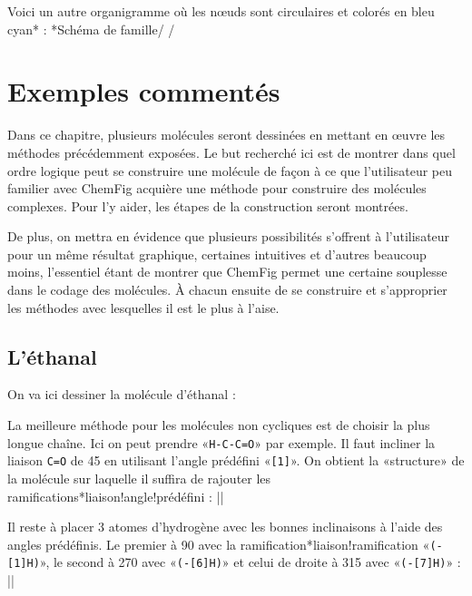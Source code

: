 \documentclass[10pt]{article}
\makeatletter
\newcommand\idx{\@ifstar{\let\print@or@not\@gobble\idx@}{\let\print@or@not\@firstofone\idx@}}
\newcommand\idx@[1]{%
	\ifcat\expandafter\noexpand\@car#1\@nil\relax%
		\expandafter\ifx\@car#1\@nil\protect
			\index{#1}%
			\print@or@not{#1}%
		\else
			\saveexpandmode\expandarg
			\StrSubstitute{\string#1}{\string @}{\@empty\protect\symbol{'100}}[\temp@]%
			\StrGobbleLeft\temp@1[\temp@]%
			\restoreexpandmode
			\expandafter\index\expandafter{\temp@ @\protect\texttt{\protect\textbackslash\temp@}}%
			\print@or@not{\texttt{\string#1}}%
		\fi
	\else
		\index{#1}%
		\print@or@not{#1}%
	\fi
}
\newcommand\make@car@active[1]{%
	\catcode`#1\active
	\begingroup
		\lccode`\~`#1\relax
		\lowercase{\endgroup\def~}%
}
\newif\if@exstar
\newcommand\exemple{%
	\begingroup
	\parskip\z@
	\@makeother\;\@makeother\!\@makeother\?\@makeother\:%
	\@ifstar{\@exstartrue\exemple@}{\@exstarfalse\exemple@}}
\newcommand\exemple@[2][65]{%
	\medbreak\noindent
	\begingroup
		\let\do\@makeother\dospecials
		\make@car@active\ { {}}%
		\make@car@active\^^M{\par\leavevmode}%
		\make@car@active\^^I{\space\space}%
		\make@car@active\,{\leavevmode\kern\z@\string,}%
		\make@car@active\-{\leavevmode\kern\z@\string-}%
		\make@car@active\>{\leavevmode\kern\z@\string>}%
		\make@car@active\<{\leavevmode\kern\z@\string<}%
		\exemple@@{#1}{#2}%
}
\newcommand\exemple@@[3]{%
	\def\@tempa##1#3{\exemple@@@{#1}{#2}{##1}}%
	\@tempa
}
\newcommand\exemple@@@[3]{%
	\xdef\the@code{#3}%
	\endgroup
	\if@exstar
		\begingroup
			\fboxrule0.4pt
			\let\breakboxparindent\z@
			\def\bkvz@bottom{\hrule\@height\fboxrule}%
			\let\bkvz@before@breakbox\relax
			\def\bkvz@set@linewidth{\advance\linewidth\dimexpr-2\fboxrule-2\fboxsep}%
			\def\bkvz@left{\vrule\@width\fboxrule\hskip\fboxsep}%
			\def\bkvz@right{\hskip\fboxsep\vrule\@width\fboxrule}%
			\def\bkvz@top{\hbox to \hsize{%
				\vrule\@width\fboxrule\@height\fboxrule
				\leaders\bkvz@bottom\hfill
				\ECFAugie
				\fboxsep\z@
				\colorbox{black}{\kern0.25em\color{white}\footnotesize\lower0.5ex\hbox{\strut#2}\kern0.25em}%
				\leaders\bkvz@bottom\hfill
				\vrule\@width\fboxrule\@height\fboxrule}}%
			\breakbox
				\kern.5ex\relax
				\ttfamily\footnotesize\the@code\par
				\normalfont
				\kern3pt
				\hrule height0.1pt width\linewidth depth0.1pt
				\vskip5pt
				\rightskip0pt plus 1fill
				\everypar{{\color{lightgray}\rlap{\vrule height0.1pt width\linewidth depth0.1pt}}\hskip0pt plus 1fill}%
				\newlinechar`\^^M\everyeof{\noexpand}\scantokens{#3}\par
			\endbreakbox
		\endgroup
	\else
		\vskip0.5ex
		\boxput*(0,1)
			{\fboxsep\z@
			\hbox{\ECFAugie\colorbox{black}{\leavevmode\kern0.25em{\color{white}\footnotesize\strut#2}\kern0.25em}}%
			}%
			{\fboxsep5pt
			\fbox{%
				$\vcenter{\hsize\dimexpr0.#1\linewidth-\fboxsep-\fboxrule\relax
					\kern5pt\parskip0pt \ttfamily\footnotesize\the@code}%
				\vcenter{\kern5pt\hsize\dimexpr\linewidth-0.#1\linewidth-\fboxsep-\fboxrule\relax
					\everypar{{\color{lightgray}\rlap{\vrule height0.1pt width\dimexpr\linewidth-0.#1\linewidth-\fboxsep-\fboxrule depth0.1pt}}}%
					\footnotesize\newlinechar`\^^M\everyeof{\noexpand}\scantokens{#3}}$%
				}%
			}%
	\fi
	\medbreak
	\endgroup
}
\let\do\@makeother\dospecials
\newcommand\CF{{\ECFAugie ChemFig}\xspace}
\makeatother
\begin{document}
Voici un autre organigramme où les nœuds sont circulaires et colorés en bleu cyan\idx*{\printatom} :
\exemple*{Schéma de famille}/
\setbondoffset{0pt}
\setatomsep{80pt}
\renewcommand\printatom[1]{\textsf{#1}}
/

\section{Exemples commentés}\label{exemples.commentes}
Dans ce chapitre, plusieurs molécules seront dessinées en mettant en œuvre les méthodes précédemment exposées. Le but recherché ici est de montrer dans quel ordre logique peut se construire une molécule de façon à ce que l'utilisateur peu familier avec \CF acquière une méthode pour construire des molécules complexes. Pour l'y aider, les étapes de la construction seront montrées.

De plus, on mettra en évidence que plusieurs possibilités s'offrent à l'utilisateur pour un même résultat graphique, certaines intuitives et d'autres beaucoup moins, l'essentiel étant de montrer que \CF permet une certaine souplesse dans le codage des molécules. À chacun ensuite de se construire et s'approprier les méthodes avec lesquelles il est le plus à l'aise.

\subsection{L'éthanal}
On va ici dessiner la molécule d'éthanal : 

La meilleure méthode pour les molécules non cycliques est de choisir la plus longue chaîne. Ici on peut prendre «\verb|H-C-C=O|» par exemple. Il faut incliner la liaison \verb|C=O| de 45\degres{} en utilisant l'angle prédéfini «\verb-[1]-». On obtient la «structure» de la molécule sur laquelle il suffira de rajouter les ramifications\idx*{liaison!angle!prédéfini} :
\exemple{Structure de l'éthanal}||

Il reste à placer 3 atomes d'hydrogène avec les bonnes inclinaisons à l'aide des angles prédéfinis. Le premier à 90\degres{} avec la ramification\idx*{liaison!ramification} «\verb/(-[1]H)/», le second à 270\degres{} avec «\verb/(-[6]H)/» et celui de droite à 315\degres{} avec «\verb/(-[7]H)/» :
\exemple{Ethanal}||
\end{document}
